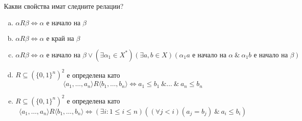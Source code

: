 \begin{problem}
  Какви свойства имат следните релации?
  \begin{enumerate}[a)]
  \item
    $\alpha R \beta \iff \alpha \mbox{ е начало на }\beta$ 
  \item
    $\alpha R \beta \iff \alpha \mbox{ е край на }\beta$
  \item
    $\alpha R \beta \iff \alpha \mbox{ е начало на }\beta \vee (\exists\alpha_1\in X^{*})(\exists a,b\in X)(\alpha_1 a \mbox{ е начало на }\alpha\ \&\ \alpha_1 b \mbox{ е начало на } \beta)$
  \item
    $R\subseteq (\{0,1\}^{n})^{2}$ е определена като
    \[\langle{a_1,\dots,a_n}\rangle R \langle{b_1,\dots,b_n}\rangle \iff a_1\leq b_1\ \&\dots\ \&\ a_n\leq b_n\]
  \item
    $R\subseteq (\{0,1\}^{n})^{2}$ е определена като
    \[\langle{a_1,\dots,a_n}\rangle R \langle{b_1,\dots,b_n}\rangle \iff (\exists i : 1\leq i\leq n)((\forall j < i)(a_j = b_j)\ \&\ a_i \leq b_i)\]
\end{enumerate}
\end{problem}

